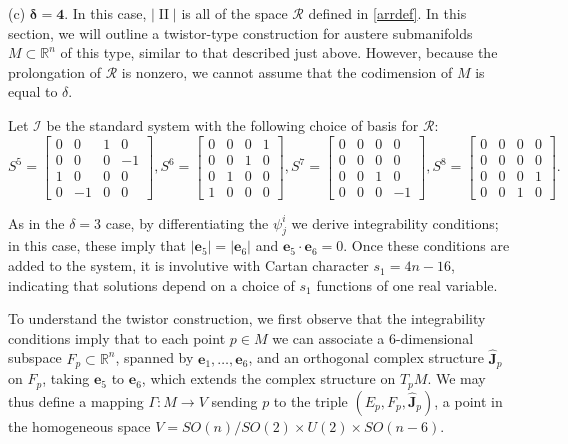 \documentclass[12pt,reqno]{amsart}
\theoremstyle{definition}
\theoremstyle{remark}
\begin{document}
\medskip
(c) $\boldsymbol{\delta=4}$.
In this case, $|{\operatorname{II}} |$ is all of the space ${\mathcal R}$ defined in \eqref{arrdef}.  In this section, we will outline
a twistor-type construction for austere submanifolds $M\subset {\mathbb R}^n$ of this type, similar to that described just above.
However, because the prolongation of ${\mathcal R}$ is nonzero, we cannot assume that the codimension of $M$
is equal to $\delta$.

Let ${{\mathcal I}}$ be the standard system with the following choice
of basis for ${\mathcal R}$:
$$S^5 = \begin{bmatrix} 0 & 0 & 1 & 0\\ 0 & 0 & 0 & -1\\ 1 & 0 & 0 & 0 \\ 0 & -1 & 0 & 0 \end{bmatrix},
S^6 = \begin{bmatrix} 0 & 0& 0 & 1 \\ 0 & 0 & 1 & 0 \\ 0 & 1 & 0 & 0 \\ 1 & 0 & 0 & 0 \end{bmatrix},
S^7 = \begin{bmatrix} 0 & 0 & 0 & 0\\ 0 & 0 & 0 & 0\\ 0 & 0 & 1 & 0 \\ 0 & 0 & 0 & -1 \end{bmatrix},
S^8 = \begin{bmatrix} 0 & 0 & 0 & 0\\ 0 & 0 & 0 & 0 \\ 0 & 0 & 0 & 1\\ 0 & 0 & 1 & 0 \end{bmatrix}.$$

As in the $\delta=3$ case, by differentiating the $\psi^i_j$ we derive integrability conditions;
in this case, these imply that $|{\mathbf e}_5|=|{\mathbf e}_6|$ and
${\mathbf e}_5 \cdot {\mathbf e}_6=0$.
Once these conditions are added to the system, it is involutive with Cartan character $s_1 = 4n-16$,
indicating that solutions depend on a choice of $s_1$ functions of one real variable.

To understand the twistor construction, we first observe that the integrability conditions
 imply that to each point $p\in M$ we can associate a 6-dimensional
subspace $F_p \subset {\mathbb R}^n$, spanned by ${\mathbf e}_1, \ldots, {\mathbf e}_6$, and an orthogonal
complex structure ${\widehat{\mathbf J}}_p$ on $F_p$, taking ${\mathbf e}_5$ to ${\mathbf e}_6$, which extends the complex structure
on $T_pM$.  We may thus define a mapping
$\Gamma:M \to V$ sending $p$ to the triple $(E_p, F_p, {\widehat{\mathbf J}}_p)$, a point in the homogeneous
space $V = SO(n)/SO(2) \times U(2) \times SO(n-6)$.
\end{document}
